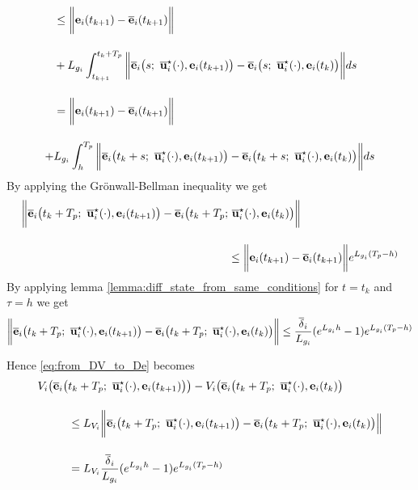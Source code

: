 \begin{gg_box}
\begin{alignat}{2}
  &\leq \bigg \| \vect{e}_i(t_{k+1}) - \overline{\vect{e}}_i(t_{k+1}) \bigg\| \\[2.5ex]
  &+  L_{g_i} \int_{t_{k+1}}^{t_k + T_p} \bigg\| \overline{\vect{e}}_i\big(s;\ \overline{\vect{u}}_i^{\star}(\cdot), \vect{e}_i(t_{k+1})\big)
  - \overline{\vect{e}}_i\big(s;\ \overline{\vect{u}}_i^{\star}(\cdot), \vect{e}_i(t_k)\big) \bigg\| ds \\[2.5ex]
  &= \bigg \| \vect{e}_i(t_{k+1}) - \overline{\vect{e}}_i(t_{k+1}) \bigg\| \\[2.5ex]
  +&  L_{g_i} \int_{h}^{T_p} \bigg\| \overline{\vect{e}}_i\big(t_k + s;\ \overline{\vect{u}}_i^{\star}(\cdot), \vect{e}_i(t_{k+1})\big)
  - \overline{\vect{e}}_i\big(t_k + s;\ \overline{\vect{u}}_i^{\star}(\cdot), \vect{e}_i(t_k)\big) \bigg\| ds
\end{alignat}
By applying the  Gr\"{o}nwall-Bellman inequality we get
\begin{alignat}{2}
  \bigg \|\overline{\vect{e}}_i\big(t_k + T_p;\ \overline{\vect{u}}_i^{\star}(\cdot), \vect{e}_i(t_{k+1})\big)
  - \overline{\vect{e}}_i\big(t_k + T_p;&\ \overline{\vect{u}}_i^{\star}(\cdot), \vect{e}_i(t_k)\big) \bigg\| \\[2.5ex]
  &\leq \bigg \| \vect{e}_i(t_{k+1}) - \overline{\vect{e}}_i(t_{k+1}) \bigg\| e^{L_{g_i} (T_p - h)}
\end{alignat}
By applying lemma \eqref{lemma:diff_state_from_same_conditions} for $t = t_k$ and
$\tau = h$ we get
\begin{alignat}{2}
  \bigg \|\overline{\vect{e}}_i\big(t_k + T_p;\ \overline{\vect{u}}_i^{\star}(\cdot), \vect{e}_i(t_{k+1})\big)
    - \overline{\vect{e}}_i\big(t_k + T_p;\ \overline{\vect{u}}_i^{\star}(\cdot), \vect{e}_i(t_k)\big) \bigg\|
    \leq \dfrac{\overline{\delta}_i}{L_{g_i}} (e^{L_{g_i}h} - 1) e^{L_{g_i} (T_p - h)}
\end{alignat}

Hence \eqref{eq:from_DV_to_De} becomes
\begin{align}
  V_i\big(\overline{\vect{e}}_i\big(&t_k + T_p;\ \overline{\vect{u}}_i^{\star}(\cdot), \vect{e}_i(t_{k+1})\big)\big)
    - V_i\big(\overline{\vect{e}}_i\big(t_k + T_p;\ \overline{\vect{u}}_i^{\star}(\cdot), \vect{e}_i(t_k)\big) \\[2.5ex]
  &\leq L_{V_i}\bigg \| \overline{\vect{e}}_i\big(t_k + T_p;\ \overline{\vect{u}}_i^{\star}(\cdot), \vect{e}_i(t_{k+1})\big)
    - \overline{\vect{e}}_i\big(t_k + T_p;\ \overline{\vect{u}}_i^{\star}(\cdot), \vect{e}_i(t_k) \big)\Big\| \\[2.5ex]
  &= L_{V_i} \dfrac{\overline{\delta}_i}{L_{g_i}} (e^{L_{g_i}h} - 1) e^{L_{g_i} (T_p - h)}
\label{eq:from_DV_to_eq}
\end{align}


\end{gg_box}
